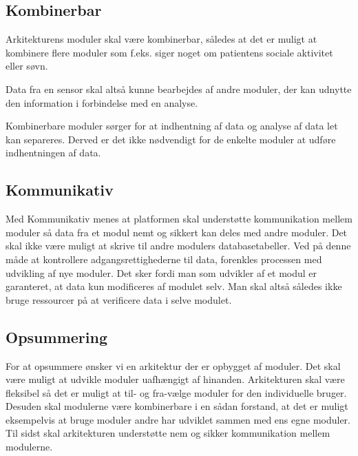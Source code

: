 \subsection{Kombinerbar}\label{arkitekturkrav::kombinerbar}
Arkitekturens moduler skal være kombinerbar, således at det er muligt at kombinere flere moduler som f.eks. siger noget om patientens sociale aktivitet eller søvn.

Data fra en sensor skal altså kunne bearbejdes af andre moduler, der kan udnytte den information i forbindelse med en analyse.

Kombinerbare moduler sørger for at indhentning af data og analyse af data let kan separeres.
Derved er det ikke nødvendigt for de enkelte moduler at udføre indhentningen af data.

\subsection{Kommunikativ}\label{arkitekturkrav::kommunikation}
Med Kommunikativ menes at platformen skal understøtte kommunikation mellem moduler så data fra et modul nemt og sikkert kan deles med andre moduler.
Det skal ikke være muligt at skrive til andre modulers databasetabeller.
Ved på denne måde at kontrollere adgangsrettighederne til data, forenkles processen med udvikling af nye moduler.
Det sker fordi man som udvikler af et modul er garanteret, at data kun modificeres af modulet selv.
Man skal altså således ikke bruge ressourcer på at verificere data i selve modulet.

\subsection{Opsummering}
For at opsummere ønsker vi en arkitektur der er opbygget af moduler.
Det skal være muligt at udvikle moduler uafhængigt af hinanden.
Arkitekturen skal være fleksibel så det er muligt at til- og fra-vælge moduler for den individuelle bruger.
Desuden skal modulerne være kombinerbare i en sådan forstand, at det er muligt eksempelvis at bruge moduler andre har udviklet sammen med ens egne moduler.
Til sidst skal arkitekturen understøtte nem og sikker kommunikation mellem modulerne.

